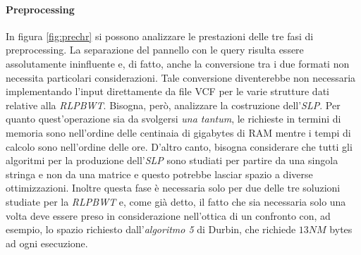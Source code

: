 \paragraph{Preprocessing}
In figura \ref{fig:prechr} si possono analizzare le prestazioni delle tre
fasi di preprocessing. La separazione del pannello con le query risulta essere
assolutamente 
ininfluente e, di fatto, anche la conversione tra i due formati non
necessita particolari considerazioni. Tale conversione 
diventerebbe non necessaria implementando l'input direttamente da file VCF per
le varie strutture dati relative alla \textit{RLPBWT}. Bisogna, però, analizzare
la costruzione 
dell'\textit{SLP}. Per quanto quest'operazione sia da svolgersi \textit{una
  tantum}, le richieste in termini di memoria sono nell'ordine delle centinaia
di gigabytes di RAM mentre i tempi di calcolo sono nell'ordine delle
ore. D'altro canto, bisogna considerare che tutti gli algoritmi per la produzione
dell'\textit{SLP} sono studiati per partire da una singola stringa e non da una
matrice e questo potrebbe lasciar spazio a diverse ottimizzazioni. Inoltre
questa fase è necessaria solo per due delle tre soluzioni studiate per la
\textit{RLPBWT} e, come già detto, il fatto che sia necessaria solo una volta
deve essere preso in considerazione nell'ottica di un confronto con, ad esempio,
lo spazio richiesto dall'\textit{algoritmo 5} di Durbin, che richiede $13NM$
bytes ad ogni esecuzione.
